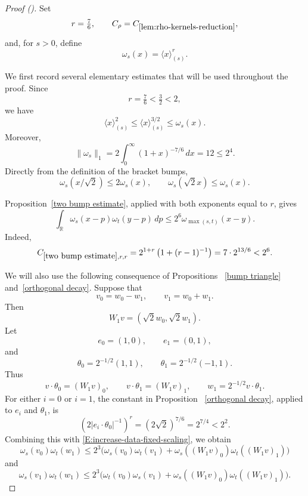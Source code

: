 \documentclass[12pt,reqno]{amsart}
\newcommand{\auto}{{({\tiny\faCar})}}
\theoremstyle{plain}
\numberwithin{equation}{section}
\theoremstyle{remark}
\begin{document}
\begin{proof}[Proof \auto]
Set
\[
r=\tfrac76,
\qquad
C_\rho=C_{\ref{lem:rho-kernels-reduction}},
\]
and, for \(s>0\), define
\[
\omega_s(x)=\langle x\rangle_{(s)}^r.
\]


We first record several elementary estimates that will be used
throughout the proof. Since
\[
r=\tfrac76<\tfrac32<2,
\]
we have
\begin{equation}
    \label{E:increase-data-weaken-exponents}
    \langle x\rangle_{(s)}^2
    \leq
    \langle x\rangle_{(s)}^{3/2}
    \leq
    \omega_s(x).
\end{equation}
Moreover,
\begin{equation}
    \label{E:increase-data-r-bump-L1}
    \|\omega_s\|_1
    =
    2\int_0^\infty(1+x)^{-7/6}\,dx
    =
    12
    \leq 2^4.
\end{equation}
Directly from the definition of the bracket bumps,
\begin{equation}
    \label{E:increase-data-fixed-scaling}
    \omega_s(x/\sqrt2)\leq2\omega_s(x),
    \qquad
    \omega_s(\sqrt2x)\leq\omega_s(x).
\end{equation}

Proposition~\ref{two bump estimate}, applied with both exponents
equal to \(r\), gives
\begin{equation}
    \label{E:increase-data-two-bump-corollary}
    \int_{\mathbb R}
    \omega_s(x-p)\omega_t(y-p)\,dp
    \leq
    2^6
    \omega_{\max(s,t)}(x-y).
\end{equation}
Indeed,
\[
C_{\ref{two bump estimate},r,r}
=
2^{1+r}\left(1+(r-1)^{-1}\right)
=
7\cdot2^{13/6}
<
2^6.
\]

We will also use the following consequence of Propositions~
\ref{bump triangle} and~\ref{orthogonal decay}. Suppose that
\[
v_0=w_0-w_1,
\qquad
v_1=w_0+w_1.
\]
Then
\[
W_1v=(\sqrt2w_0,\sqrt2w_1).
\]
Let
\[
e_0=(1,0),
\qquad
e_1=(0,1),
\]
and
\[
\theta_0=2^{-1/2}(1,1),
\qquad
\theta_1=2^{-1/2}(-1,1).
\]
Thus
\[
v\cdot\theta_0=(W_1v)_0,
\qquad
v\cdot\theta_1=(W_1v)_1,
\qquad
w_1=2^{-1/2}v\cdot\theta_1.
\]
For either \(i=0\) or \(i=1\), the constant in Proposition~
\ref{orthogonal decay}, applied to \(e_i\) and \(\theta_1\), is
\[
(2|e_i\cdot\theta_0|^{-1})^r
=
(2\sqrt2)^{7/6}
=
2^{7/4}
<
2^2.
\]
Combining this with
\eqref{E:increase-data-fixed-scaling}, we obtain
\begin{equation}
    \label{E:increase-data-mixed-zero}
    \omega_s(v_0)\omega_t(w_1) \leq 2^3\Big( \omega_s(v_0)\omega_t(v_1) + \omega_s((W_1v)_0) \omega_t((W_1v)_1) \Big)
\end{equation}
and
\begin{equation}
    \label{E:increase-data-mixed-one}
    \omega_s(v_1)\omega_t(w_1) \leq 2^3\Big( \omega_t(v_0)\omega_s(v_1) + \omega_s((W_1v)_0) \omega_t((W_1v)_1) \Big).
\end{equation}


\end{proof}
\end{document}
